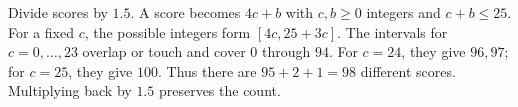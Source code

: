 Divide scores by $1.5$. A score becomes $4c+b$ with $c,b\ge 0$ integers and $c+b\le 25$. For a fixed $c$, the possible integers form $[4c,25+3c]$. The intervals for $c=0,\ldots,23$ overlap or touch and cover $0$ through $94$. For $c=24$, they give $96,97$; for $c=25$, they give $100$. Thus there are $95+2+1=\boxed{98}$ different scores. Multiplying back by $1.5$ preserves the count.
